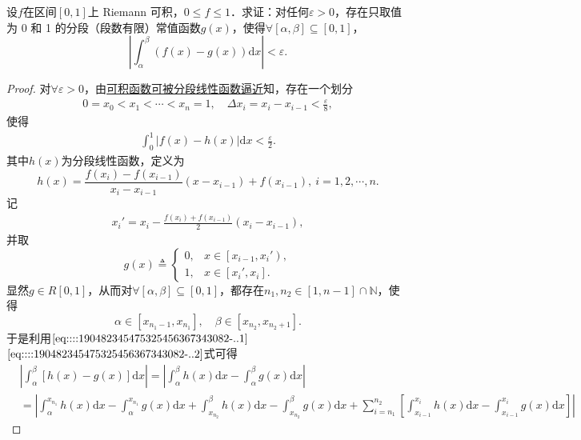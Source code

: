 \documentclass[../../main.tex]{subfiles}%
\begin{document}
\begin{example}
设\( f \)在区间\( [0,1] \)上 Riemann 可积，\( 0 \leqslant f \leqslant 1 \)．求证：对任何\( \varepsilon > 0 \)，存在只取值为 0 和 1 的分段（段数有限）常值函数\( g(x) \)，使得\( \forall [\alpha, \beta] \subseteq [0,1] \)，
\[
\left| \int_{\alpha}^{\beta} (f(x) - g(x)) \mathrm{d}x \right| < \varepsilon.
\]
\end{example}
\begin{proof}
对\(\forall \varepsilon > 0\)，由\hyperref[theorem:可积被连续函数逼近]{可积函数可被分段线性函数逼近}知，存在一个划分
\begin{align}
0 = x_0 < x_1 < \cdots < x_n = 1, \quad \Delta x_i = x_i - x_{i-1} < \frac{\varepsilon}{8}, \label{eq::::190482345475325456367343082-..1}
\end{align}
使得
\begin{align}
\int_0^1 \left| f(x) - h(x) \right| \mathrm{d}x < \frac{\varepsilon}{2}. \label{eq::::190482345475325456367343082-..3}
\end{align}
其中\( h(x) \)为分段线性函数，定义为
\[
h(x) = \frac{f(x_i) - f(x_{i-1})}{x_i - x_{i-1}} \left( x - x_{i-1} \right) + f(x_{i-1}), \ i = 1,2,\cdots,n.
\]
记
\begin{align}
x_i' = x_i - \frac{f(x_i) + f(x_{i-1})}{2} \left( x_i - x_{i-1} \right), \label{eq::::190482345475325456367343082-..2}
\end{align}
并取
\[
g(x) \triangleq \begin{cases}
0, & x \in \left[ x_{i-1}, x_i' \right), \\
1, & x \in \left[ x_i', x_i \right].
\end{cases}
\]
显然\( g \in R[0,1] \)，从而对\(\forall [\alpha, \beta] \subseteq [0,1] \)，都存在\( n_1, n_2 \in [1, n-1] \cap \mathbb{N} \)，使得
\[
\alpha \in \left[ x_{n_1 - 1}, x_{n_1} \right], \quad \beta \in \left[ x_{n_2}, x_{n_2 + 1} \right].
\]
于是利用\(\eqref{eq::::190482345475325456367343082-..1}\)\(\eqref{eq::::190482345475325456367343082-..2}\)式可得
\begin{align*}
&\left| \int_{\alpha}^{\beta}{\left[ h\left( x \right) -g\left( x \right) \right] \mathrm{d}x} \right|=\left| \int_{\alpha}^{\beta}{h\left( x \right) \mathrm{d}x}-\int_{\alpha}^{\beta}{g\left( x \right) \mathrm{d}x} \right|
\\
&=\left| \int_{\alpha}^{x_{n_1}}{h\left( x \right) \mathrm{d}x}-\int_{\alpha}^{x_{n_1}}{g\left( x \right) \mathrm{d}x}+\int_{x_{n_2}}^{\beta}{h\left( x \right) \mathrm{d}x}-\int_{x_{n_2}}^{\beta}{g\left( x \right) \mathrm{d}x}+\sum_{i=n_1}^{n_2}{\left[ \int_{x_{i-1}}^{x_i}{h\left( x \right) \mathrm{d}x}-\int_{x_{i-1}}^{x_i}{g\left( x \right) \mathrm{d}x} \right]} \right|

\end{align*}
\end{proof}
\end{document}
